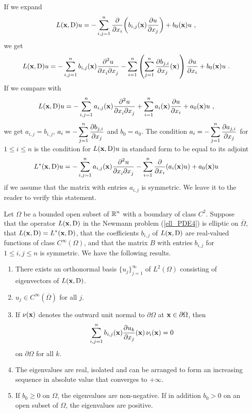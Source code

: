 \begin{rmk}
If we expand
\[
L(\VEC{x}, \diff)u = -\sum_{i,j=1}^n
\pdfdx{\left( b_{i,j}(\VEC{x}) \pdydx{u}{x_j} \right)}{x_i} + b_0(\VEC{x})u \ ,
\]
we get
\[
L(\VEC{x}, \diff)u = -\sum_{i,j=1}^n b_{i,j}(\VEC{x})
\pdydxnm{u}{x_i}{x_j}{2}{}{}
- \sum_{i=1}^n \left( \sum_{j=1}^n \pdydx{b_{j,i}}{x_j}(\VEC{x}) \right)
\pdydx{u}{x_i} + b_0(\VEC{x})u \ .
\]
If we compare with
\[
L(\VEC{x}, \diff)u = -\sum_{i,j=1}^n a_{i,j}(\VEC{x})
\pdydxnm{u}{x_i}{x_j}{2}{}{}
+ \sum_{i=1}^n a_i(\VEC{x}) \pdydx{u}{x_i} + a_0(\VEC{x})u \ ,
\]
we get $a_{i,j} = b_{i,j}$, 
$\displaystyle a_i = - \sum_{j=1}^n \pdydx{b_{j,i}}{x_j}$ and
$b_0 = a_0$.  The condition
$\displaystyle a_i = - \sum_{j=1}^n \pdydx{a_{j,i}}{x_j}$ for
$1 \leq i \leq n$ is the condition for $L(\VEC{x}, \diff)u$ in
standard form to be equal to its adjoint
\[
L^\ast(\VEC{x}, \diff)u = -\sum_{i,j=1}^n a_{i,j}(\VEC{x})
\pdydxnm{u}{x_i}{x_j}{2}{}{}
- \sum_{i=1}^n \pdfdx{\left( a_i(\VEC{x}) u\right)}{x_i} +
a_0(\VEC{x})u
\]
if we assume that the matrix with entries $a_{i,j}$ is symmetric.  We
leave it to the reader to verify this statement.
\end{rmk}

\begin{theorem} \label{ell_exist_th5}
Let $\Omega$ be a bounded open subset of $\displaystyle \RR^n$ with a boundary
of class $\displaystyle C^2$.
Suppose that the operator $L(\VEC{x},\diff)$ in the Newmann problem
(\ref{ell_PDE4}) is elliptic on $\overline{\Omega}$, that
$\displaystyle L(\VEC{x},\diff)=L^\ast(\VEC{x},\diff)$, that the
coefficients $b_{i,j}$ of $L(\VEC{x},\diff)$ are real-valued
functions of class $C^\infty(\Omega)$, and that the \nn matrix $B$ with entries
$b_{i,j}$ for $1\leq i,j\leq n$ is symmetric.  We have the following results.
\begin{enumerate}
\item There exists an orthonormal basis $\displaystyle \{u_j\}_{j=1}^\infty$ of
$\displaystyle L^2(\Omega)$ consisting of eigenvectors of $L(\VEC{x},\diff)$.
\item $\displaystyle u_j \in C^\infty(\overline{\Omega})$ for all $j$.
\item If $\VEC{\nu}(\VEC{x})$ denotes the outward unit normal to
$\partial \Omega$ at $\VEC{x} \in \partial \Omega$, then
\[
\sum_{i,j=1}^n b_{i,j}(\VEC{x}) \pdydx{u_k}{x_j}(\VEC{x})\,\nu_i(\VEC{x})= 0
\]
on $\partial \Omega$ for all $k$.
\item The eigenvalues are real, isolated and can be arranged to form an
increasing sequence in absolute value that converges to $+\infty$.
\item If $b_0\geq 0$ on $\Omega$, the eigenvalues are non-negative.
If in addition $b_0>0$ on an open subset of $\Omega$, the eigenvalues
are positive.
\end{enumerate}
\end{theorem}

